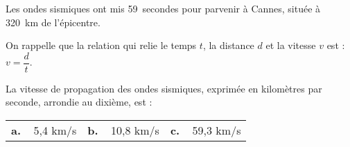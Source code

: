 \begin{enumerate}
Les ondes sismiques ont mis 59~secondes pour parvenir à Cannes, située à 320~km de l'épicentre. 

On rappelle que la relation qui relie le temps $t$, la distance $d$ et la vitesse $v$ est : $v = \dfrac{d}{t}$. 

La vitesse de propagation des ondes sismiques, exprimée en kilomètres par seconde, arrondie au dixième, est : 

\medskip
\begin{tabularx}{\linewidth}{*{3}X}
\textbf{a.~~}5,4 km/s&\textbf{b.~~}10,8 km/s &\textbf{c.~~}59,3 km/s
\end{tabularx}
\medskip
\end{enumerate}

\vspace{0,5cm}

